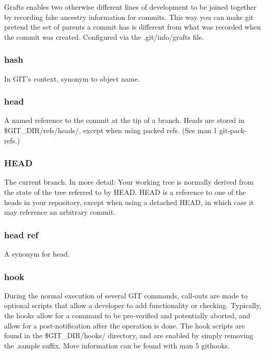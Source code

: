 Grafts enables two otherwise different lines of development to be joined together by recording fake ancestry information for commits. This way you can make git pretend the set of parents a commit has is different from what was recorded when the commit was created. Configured via the .git/info/grafts file.

\subsubsection{hash}

In GIT's context, synonym to object name.

\subsubsection{head}

A named reference to the commit at the tip of a branch. Heads are stored in \$GIT\_DIR/refs/heads/, except when using packed refs. (See man 1 git-pack-refs.)

\subsubsection{HEAD}

The current branch. In more detail: Your working tree is normally derived from the state of the tree referred to by HEAD. HEAD is a reference to one of the heads in your repository, except when using a detached HEAD, in which case it may reference an arbitrary commit.

\subsubsection{head ref}

A synonym for head.

\subsubsection{hook}

During the normal execution of several GIT commands, call-outs are made to optional scripts that allow a developer to add functionality or checking. Typically, the hooks allow for a command to be pre-verified and potentially aborted, and allow for a post-notification after the operation is done. The hook scripts are found in the \$GIT\_DIR/hooks/ directory, and are enabled by simply removing the .sample suffix. More information can be found with man 5 githooks.

